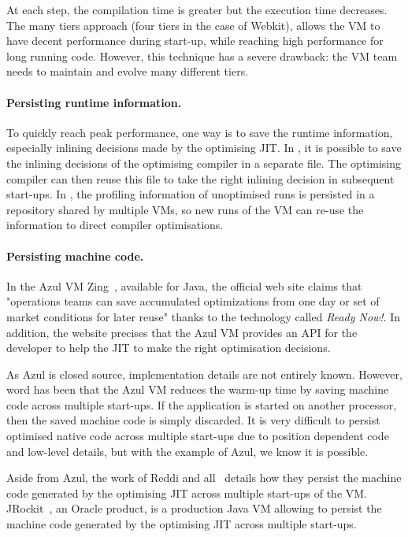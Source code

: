 \documentclass[a4paper,12pt,twoside]{../includes/ThesisStyle}
\begin{document}
At each step, the compilation time is greater but the execution time decreases. The many tiers approach (four tiers in the case of Webkit), allows the VM to have decent performance during start-up, while reaching high performance for long running code. However, this technique has a severe drawback: the VM team needs to maintain and evolve many different tiers.

\paragraph{Persisting runtime information.}

To quickly reach peak performance, one way is to save the runtime information, especially inlining decisions made by the optimising JIT. In 
 \cite{Sun06}, it is possible to save the inlining decisions of the optimising compiler in a separate file. The optimising compiler can then reuse this file to take the right inlining decision in subsequent start-ups. In \cite{Arno05c}, the profiling information of unoptimised runs is persisted in a repository shared by multiple VMs, so new runs of the VM can re-use the information to direct compiler optimisations.

\paragraph{Persisting machine code.}

In the Azul VM Zing~\cite{Azul}, available for Java, the official web site claims that "operations teams can save accumulated optimizations from one day or set of market conditions for later reuse" thanks to the technology called \emph{Ready Now!}. In addition, the website precises that the Azul VM provides an API for the developer to help the JIT to make the right optimisation decisions. 

As Azul is closed source, implementation details are not entirely known. However, word has been that the Azul VM reduces the warm-up time by saving machine code across multiple start-ups. If the application is started on another processor, then the saved machine code is simply discarded. It is very difficult to persist optimised native code across multiple start-ups due to position dependent code and low-level details, but with the example of Azul, we know it is possible.

Aside from Azul, the work of Reddi and all~\cite{Redd07a} details how they persist the machine code generated by the optimising JIT across multiple start-ups of the VM. JRockit~\cite{JRockit}, an Oracle product, is a production Java VM allowing to persist the machine code generated by the optimising JIT across multiple start-ups.
\end{document}
